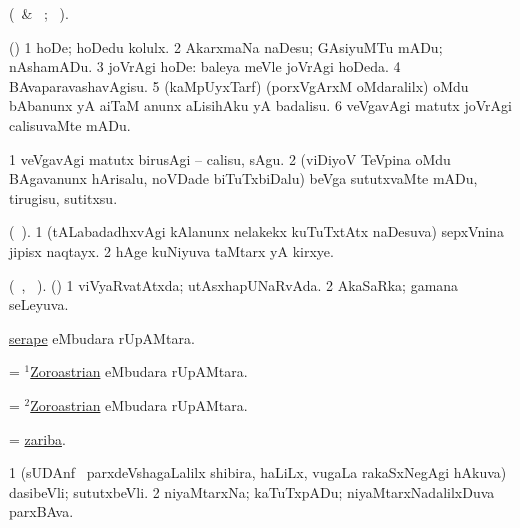 \bentry
{} 
\gl{\kirx} 
\bmng
(\BU\ \& \BUkaq\ ; \vakaq\ ). 
\emng

\noindent
\gl{\sakirx} 
\bmng
(\ashi) 
\bnum
\num{1} hoDe; hoDedu kolulx. 
\num{2} AkarxmaNa naDesu; GAsiyuMTu mADu; nAshamADu.
\num{3} joVrAgi hoDe:  baleya meVle joVrAgi hoDeda. 
\num{4} BAvaparavashavAgisu.   
\num{5} (kaMpUyxTarf) (porxVgArxM oMdaralilx) oMdu bAbanunx yA aiTaM anunx aLisihAku yA badalisu. 
\num{6} veVgavAgi matutx joVrAgi calisuvaMte mADu.
\enum
\emng

\noindent
\gl{\akirx}  
\bmng
\bnum
\num{1} veVgavAgi matutx birusAgi -- calisu, sAgu. 
\num{2} (viDiyoV TeVpina oMdu BAgavanunx hArisalu, noVDade biTuTxbiDalu) beVga sututxvaMte mADu, tirugisu, sutitxsu.
\enum
\emng
\eentry

\bentry
{} 
\gl{\nA} 
\bmng
(\bava\ ). 
\bnum
\num{1} (tALabadadhxvAgi kAlanunx nelakekx kuTuTxtAtx naDesuva) sepxVnina jipisx naqtayx. 
\num{2} hAge kuNiyuva taMtarx yA kirxye.
\enum
\emng
\eentry

\bentry
{} 
\gl{\gu} 
\bmng
(\tara\ , \tama\ ). (\AmA)
\bnum 
\num{1} viVyaRvatAtxda; utAsxhapUNaRvAda. 
\num{2} AkaSaRka; gamana seLeyuva.
\enum
\emng
\eentry

\bentry
{} 
\gl{\saMkiSx} 
\bmng
{}
\emng
\eentry

\bentry
{} 
\gl{\nA} 
\bmng
\hyperref{kandict_s.pdf}{S}{serape}{serape} eMbudara rUpAMtara.
\emng
\eentry

\bentry
{} 
\gl{\gu}
\bmng
= \hyperlink{Zoroastrian(1)}{$^1$Zoroastrian} eMbudara rUpAMtara.
\emng
\eentry

\bentry
{} 
\gl{\nA}
\bmng
= \hyperlink{Zoroastrian(2)}{$^2$Zoroastrian} eMbudara rUpAMtara.
\emng
\eentry

\bentry
{} 
\gl{\nA} 
\bmng
= \hyperlink{zariba}{zariba}.
\emng
\eentry

\bentry
{} 
\gl{\nA}
\bmng
\bnum
\num{1} (sUDAnf \mo\ parxdeVshagaLalilx shibira,  haLiLx,  \mo vugaLa  rakaSxNegAgi hAkuva) dasibeVli; sututxbeVli. 
\num{2} niyaMtarxNa; kaTuTxpADu; niyaMtarxNadalilxDuva parxBAva.
\enum
\emng
\eentry


